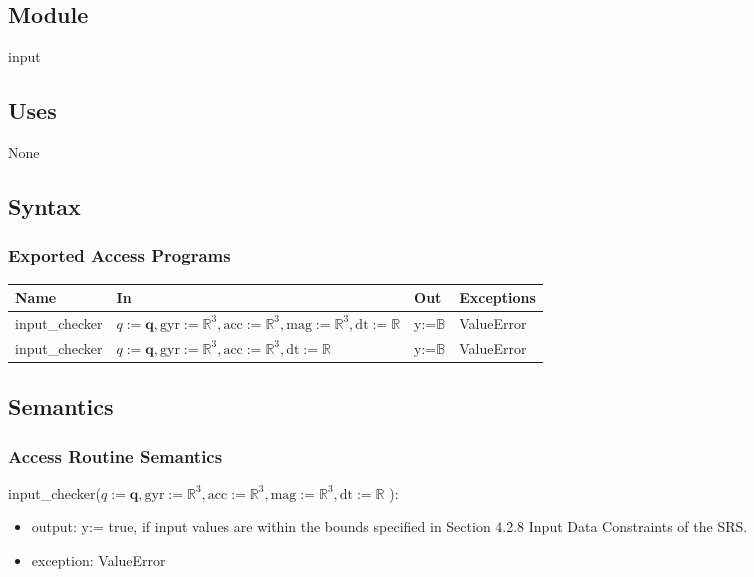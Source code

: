 \documentclass[12pt, titlepage]{article}
\begin{document}
\subsection{Module}
input

\subsection{Uses}
None

\subsection{Syntax}

\subsubsection{Exported Access Programs}

\begin{center}
\begin{tabular}{p{3cm} p{8cm} p{1cm} p{2cm}}
\hline
\textbf{Name} & \textbf{In} & \textbf{Out} & \textbf{Exceptions} \\
\hline
input\_checker & $q:=\mathbf{q}, \text{gyr}:=\mathbb{R}^3, \text{acc}:=\mathbb{R}^3, \text{mag}:=\mathbb{R}^3, \text{dt}:=\mathbb{R}$ & y:=$\mathbb{B}$ & ValueError \\
input\_checker & $q:=\mathbf{q}, \text{gyr}:=\mathbb{R}^3, \text{acc}:=\mathbb{R}^3, \text{dt}:=\mathbb{R}$ & y:=$\mathbb{B}$ & ValueError \\
\hline
\end{tabular}
\end{center}

\subsection{Semantics}


\subsubsection{Access Routine Semantics}

\noindent input\_checker($q:=\mathbf{q}, \text{gyr}:=\mathbb{R}^3, \text{acc}:=\mathbb{R}^3, \text{mag}:=\mathbb{R}^3, \text{dt}:=\mathbb{R}$ ):
\begin{itemize}
\item output: y:= true, if input values are within the bounds specified in Section 4.2.8 Input Data Constraints of the SRS.
\item exception: ValueError
\end{itemize}
\end{document}
